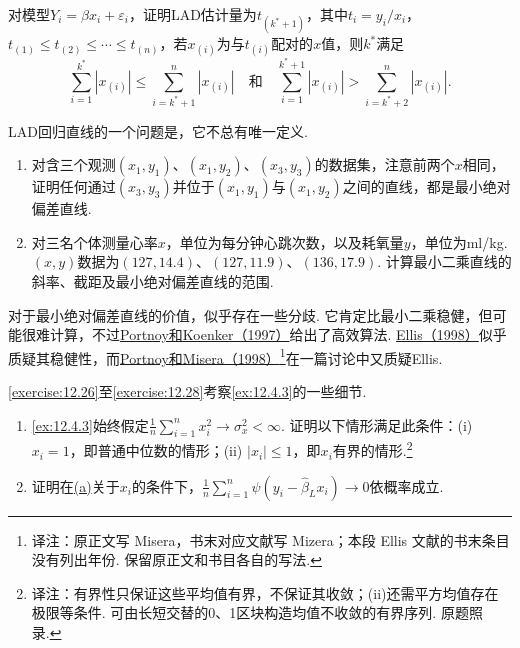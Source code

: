 \begin{exercise}\label{exercise:12.24}
对模型$Y_i=\beta x_i+\varepsilon_i$，证明LAD估计量为$t_{(k^*+1)}$，其中$t_i=y_i/x_i$，$t_{(1)}\le t_{(2)}\le\cdots\le t_{(n)}$，若$x_{(i)}$为与$t_{(i)}$配对的$x$值，则$k^*$满足
$$\sum_{i=1}^{k^*}|x_{(i)}|\le\sum_{i=k^*+1}^n|x_{(i)}|\quad\text{和}\quad
\sum_{i=1}^{k^*+1}|x_{(i)}|>\sum_{i=k^*+2}^n|x_{(i)}|.$$
\end{exercise}

\begin{exercise}\label{exercise:12.25}
LAD回归直线的一个问题是，它不总有唯一定义.
\begin{enumerate}[label=(\alph*)]
\item\label{item:12.25.a} 对含三个观测$(x_1,y_1)$、$(x_1,y_2)$、$(x_3,y_3)$的数据集，注意前两个$x$相同，证明任何通过$(x_3,y_3)$并位于$(x_1,y_1)$与$(x_1,y_2)$之间的直线，都是最小绝对偏差直线.
\item\label{item:12.25.b} 对三名个体测量心率$x$，单位为每分钟心跳次数，以及耗氧量$y$，单位为ml/kg. $(x,y)$数据为$(127,14.4)$、$(127,11.9)$、$(136,17.9)$. 计算最小二乘直线的斜率、截距及最小绝对偏差直线的范围.
\end{enumerate}
对于最小绝对偏差直线的价值，似乎存在一些分歧. 它肯定比最小二乘稳健，但可能很难计算，不过\hyperref[bib:source244]{Portnoy和Koenker（1997）}给出了高效算法. \hyperref[bib:source115]{Ellis（1998）}似乎质疑其稳健性，而\hyperref[bib:source245]{Portnoy和Misera（1998）}\footnote{译注：原正文写 Misera，书末对应文献写 Mizera；本段 Ellis 文献的书末条目没有列出年份. 保留原正文和书目各自的写法.}在一篇讨论中又质疑Ellis.
\end{exercise}

\autoref{exercise:12.26}至\autoref{exercise:12.28}考察\autoref{ex:12.4.3}的一些细节.
\begin{exercise}\label{exercise:12.26}\leavevmode
\begin{enumerate}[label=(\alph*)]
\item\label{item:12.26.a} \autoref{ex:12.4.3}始终假定$\frac1n\sum_{i=1}^nx_i^2\to\sigma_x^2<\infty$. 证明以下情形满足此条件：(i) $x_i=1$，即普通中位数的情形；(ii) $|x_i|\le1$，即$x_i$有界的情形.\footnote{译注：有界性只保证这些平均值有界，不保证其收敛；(ii)还需平方均值存在极限等条件. 可由长短交替的0、1区块构造均值不收敛的有界序列. 原题照录.}
\item\label{item:12.26.b} 证明在\hyperref[item:12.26.a]{(a)}关于$x_i$的条件下，$\frac1n\sum_{i=1}^n\psi(y_i-\hat\beta_Lx_i)\to0$依概率成立.
\end{enumerate}
\end{exercise}

